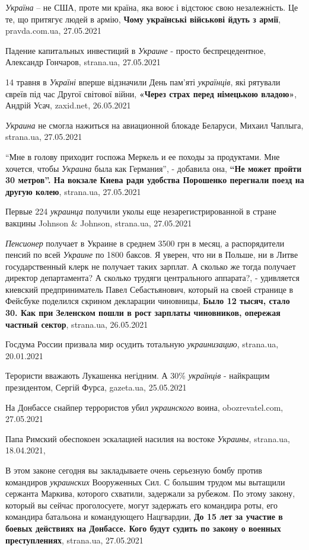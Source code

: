 \emph{Україна} – не США, проте ми країна, яка воює і відстоює свою
незалежність. Це те, що притягує людей в армію, \textbf{Чому українські
військові йдуть з армії},  pravda.com.ua, 27.05.2021

Падение капитальных инвестиций в \emph{Украине} - просто беспрецедентное,
Александр Гончаров, strana.ua, 27.05.2021

14 травня в \emph{Україні} вперше відзначили День пам'яті \emph{українців}, які
рятували євреїв під час Другої світової війни, \textbf{«Через страх перед
німецькою владою»}, Андрій Усач, zaxid.net, 26.05.2021

\emph{Украина} не смогла нажиться на авиационной блокаде Беларуси, Михаил
Чаплыга, strana.ua, 27.05.2021

\enquote{Мне в голову приходит госпожа Меркель и ее походы за продуктами. Мне
хочется, чтобы \emph{Украина} была как Германия}, - добавила она, \textbf{\enquote{Не
может пройти 30 метров}. На вокзале Киева ради удобства Порошенко перегнали
поезд на другую колею}, strana.ua, 27.05.2021

Первые 224 \emph{украинца} получили уколы еще незарегистрированной в стране
вакцины Johnson \& Johnson, strana.ua, 27.05.2021

\emph{Пенсионер} получает в Украине в среднем 3500 грн в месяц, а распорядители
пенсий по всей \emph{Украине} по 1800 баксов.  Я уверен, что ни в Польше, ни в
Литве государственный клерк не получает таких зарплат. А сколько же тогда
получает директор департамента? А сколько трудяги центрального аппарата?, -
удивляется киевский предприниматель Павел Себастьянович, который на своей
странице в Фейсбуке поделился скрином декларации чиновницы, \textbf{Было 12
тысяч, стало 30. Как при Зеленском пошли в рост зарплаты чиновников, опережая
частный сектор}, strana.ua, 26.05.2021

Госдума России призвала мир осудить тотальную \emph{украинизацию}, strana.ua,
20.01.2021

Терористи вважають Лукашенка негідним. А 30\% \emph{українців} - найкращим
президентом, Сергій Фурса, gazeta.ua, 25.05.2021

На Донбассе снайпер террористов убил \emph{украинского} воина, obozrevatel.com,
27.05.2021

Папа Римский обеспокоен эскалацией насилия на востоке \emph{Украины},
strana.ua, 18.04.2021,

В этом законе сегодня вы закладываете очень серьезную бомбу против командиров
\emph{украинских} Вооруженных Сил. С большим трудом мы вытащили сержанта Маркива,
которого схватили, задержали за рубежом. По этому закону, который вы сейчас
проголосуете, могут задержать его командира роты, его командира батальона и
командующего Нацгвардии, \textbf{До 15 лет за участие в боевых действиях на Донбассе. Кого будут судить по закону о военных преступлениях}, strana.ua, 27.05.2021


